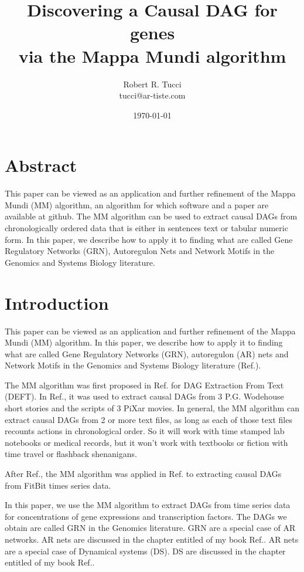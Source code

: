 \documentclass[12pt]{article}
\begin{document}
\title{Discovering a Causal DAG for genes \\ via the Mappa Mundi algorithm}
\date{ \today}
\author{Robert R. Tucci\\
        tucci@ar-tiste.com}
\maketitle
\vskip2cm
\section*{Abstract}
This paper can be viewed
as an application and further refinement 
of the Mappa Mundi (MM) algorithm,
an algorithm  for which software and a paper are available at github. 
The MM algorithm can be used to extract
causal DAGs from chronologically ordered data that is either in sentences text or tabular numeric form. 
In this paper, we 
describe how to apply it to finding what
are called Gene Regulatory Networks (GRN),
Autoregulon  Nets
and Network Motifs 
in the Genomics and Systems Biology literature.
\section{Introduction}

This paper can be viewed
as an application and further refinement 
of the Mappa Mundi (MM) algorithm.  
In this paper, we 
describe how to apply it to finding what
are called Gene Regulatory Networks (GRN),
autoregulon (AR) nets
and Network Motifs 
in the Genomics and Systems Biology literature (Ref.\cite{alon-book}).


The MM algorithm
was first proposed in Ref.\cite{mappa-mundi} 
for DAG Extraction From Text (DEFT). 
In Ref.\cite{mappa-mundi}, it was used to 
extract causal DAGs from 3 P.G. Wodehouse short stories and the scripts of 3 PiXar movies.
In general, the MM algorithm can extract causal DAGs from 2 or more 
text files, as long as each of
those text files recounts actions 
in chronological order. So it will work with time stamped lab
notebooks or medical records, 
but it won't work with textbooks or fiction with  time travel or flashback shenanigans.

After Ref.\cite{mappa-mundi}, the MM algorithm was applied in Ref.\cite{causal-fitbit} to extracting causal DAGs from FitBit times
series data.

In this paper, we use the MM algorithm
to extract DAGs from time series data for
concentrations of
gene expressions and transcription factors.
The DAGs we obtain are called GRN
in the Genomics literature. GRN are a
special case of AR networks.
AR nets are 
discussed in the chapter entitled  of 
my book Ref.\cite{Bayesuvius}.
AR nets are a special case of Dynamical systems (DS). DS are discussed in the
chapter entitled 
of my book Ref.\cite{Bayesuvius}.
\end{document}
